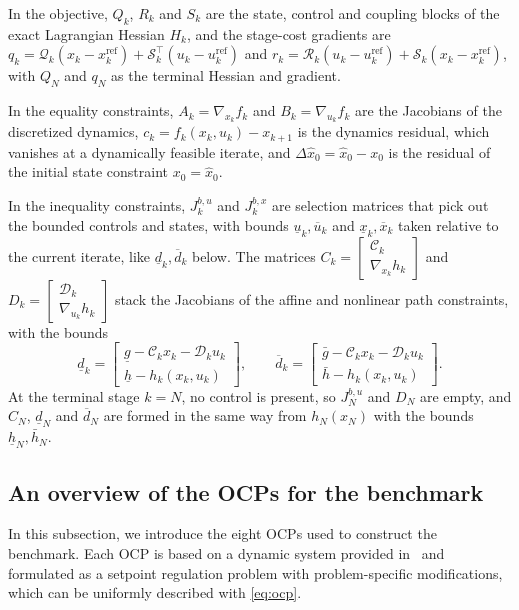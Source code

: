 \documentclass[class=scrbook, crop=false]{standalone}
\begin{document}
In the objective, $Q_k$, $R_k$ and $S_k$ are the state, control and coupling blocks of the exact Lagrangian Hessian $H_k$,
and the stage-cost gradients are
$q_k=\mathcal{Q}_k(x_k-x_k^{\mathrm{ref}})+\mathcal{S}_k^{\top}(u_k-u_k^{\mathrm{ref}})$ and
$r_k=\mathcal{R}_k(u_k-u_k^{\mathrm{ref}})+\mathcal{S}_k(x_k-x_k^{\mathrm{ref}})$,
with $Q_N$ and $q_N$ as the terminal Hessian and gradient.

In the equality constraints, $A_k=\nabla_{x_k} f_k$ and $B_k=\nabla_{u_k} f_k$ are the Jacobians of the discretized dynamics,
$c_k=f_k(x_k,u_k)-x_{k+1}$ is the dynamics residual, which vanishes at a dynamically feasible iterate,
and $\Delta\hat{x}_0=\hat{x}_0-x_0$ is the residual of the initial state constraint $x_0=\hat{x}_0$.

In the inequality constraints, $J_k^{b,u}$ and $J_k^{b,x}$ are selection matrices that pick out the bounded controls and states,
with bounds $\underline{u}_k,\overline{u}_k$ and $\underline{x}_k,\overline{x}_k$ taken 
relative to the current iterate, like $\underline{d}_k,\overline{d}_k$ below.
The matrices $C_k=\left[\begin{smallmatrix}\mathcal{C}_k\\ \nabla_{x_k} h_k\end{smallmatrix}\right]$ and
$D_k=\left[\begin{smallmatrix}\mathcal{D}_k\\ \nabla_{u_k} h_k\end{smallmatrix}\right]$
stack the Jacobians of the affine and nonlinear path constraints, with the bounds
\begin{equation*}
    \underline{d}_k=\begin{bmatrix}\underline{g}-\mathcal{C}_k x_k-\mathcal{D}_k u_k\\ \underline{h}-h_k(x_k,u_k)\end{bmatrix}, \qquad
    \overline{d}_k=\begin{bmatrix}\bar{g}-\mathcal{C}_k x_k-\mathcal{D}_k u_k\\ \bar{h}-h_k(x_k,u_k)\end{bmatrix}.
\end{equation*}
At the terminal stage $k=N$, no control is present, so $J_N^{b,u}$ and $D_N$ are empty,
and $C_N$, $\underline{d}_N$ and $\overline{d}_N$ are formed in the same way from $h_N(x_N)$
with the bounds $\underline{h}_N,\bar{h}_N$.

\subsection{An overview of the OCPs for the benchmark}
\label{subsec:benchmark_ocps}
In this subsection, we introduce the eight \glspl{OCP} used to construct the benchmark. 
Each \gls{OCP} is based on a dynamic system provided in~\cite{Kiessling2026} 
and formulated as a setpoint regulation problem with problem-specific modifications,
which can be uniformly described with \eqref{eq:ocp}.
\end{document}
